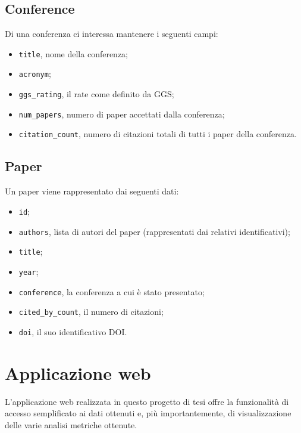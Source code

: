 \subsection{Conference}

Di una conferenza ci interessa mantenere i seguenti campi:
\begin{itemize}
  \item \texttt{title}, nome della conferenza;
  \item \texttt{acronym};
  \item \texttt{ggs\_rating}, il rate come definito da GGS;
  \item \texttt{num\_papers}, numero di paper accettati dalla conferenza;
  \item \texttt{citation\_count}, numero di citazioni totali di tutti i paper della conferenza.
\end{itemize}

\subsection{Paper}

Un paper viene rappresentato dai seguenti dati:

\begin{itemize}
  \item \texttt{id};
  \item \texttt{authors}, lista di autori del paper (rappresentati dai relativi identificativi);
  \item \texttt{title};
  \item \texttt{year};
  \item \texttt{conference}, la conferenza a cui è stato presentato;
  \item \texttt{cited\_by\_count}, il numero di citazioni;
  \item \texttt{doi}, il suo identificativo DOI.
\end{itemize}


\section{Applicazione web}

L'applicazione web realizzata in questo progetto di tesi offre la funzionalità
di accesso semplificato ai dati ottenuti e, più importantemente, di visualizzazione
delle varie analisi metriche ottenute.

